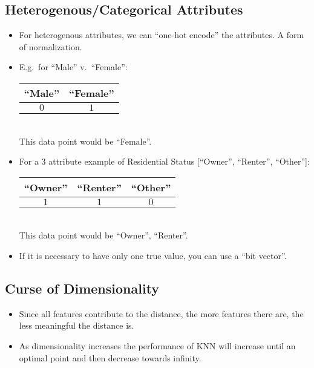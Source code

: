 \documentclass[12pt]{article}
\begin{document}
        \subsection{Heterogenous/Categorical Attributes}
            \begin{itemize}
                \item For heterogenous attributes, we can ``one-hot encode'' the attributes. A form of normalization.
                \item E.g.\ for ``Male'' v.\ ``Female'': \\
                \begin{tabular}{|c|c|}
                    \hline
                    ``Male'' & ``Female'' \\
                    \hline
                    $0$ & $1$ \\
                    \hline
                \end{tabular} \\
                This data point would be ``Female''.
                \item For a $3$ attribute example of Residential Status [``Owner'', ``Renter'', ``Other'']: \\
                \begin{tabular}{|c|c|c|}
                    \hline
                    ``Owner'' & ``Renter'' & ``Other'' \\
                    \hline
                    $1$ & $1$ & $0$ \\
                    \hline
                \end{tabular} \\
                This data point would be ``Owner'', ``Renter''.
                \item If it is necessary to have only one true value, you can use a ``bit vector''.
            \end{itemize}
        \subsection{Curse of Dimensionality}
            \begin{itemize}
                \item Since all features contribute to the distance, the more features there are, the less meaningful the distance is.
                \item As dimensionality increases the performance of KNN will increase until an optimal point and then decrease towards infinity.
            \end{itemize}
\end{document}
